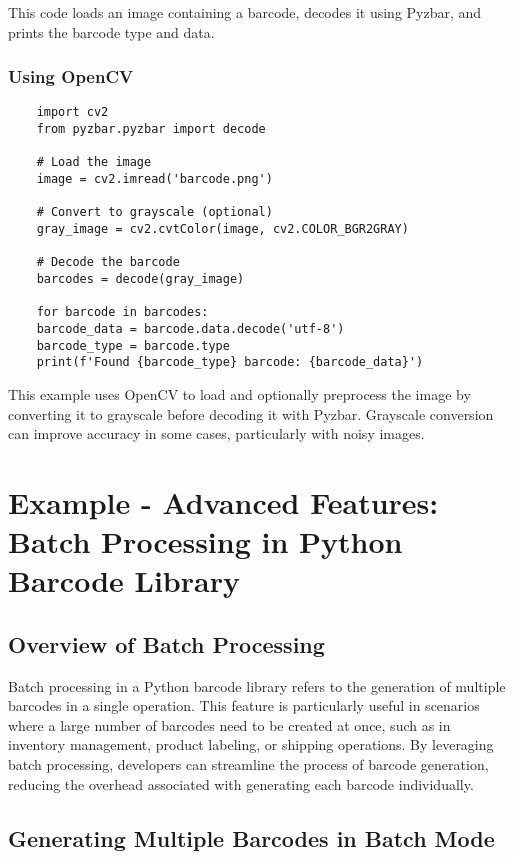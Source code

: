 This code loads an image containing a barcode, decodes it using Pyzbar, and prints the barcode type and data.

\subsubsection{Using OpenCV}

\begin{lstlisting}
	import cv2
	from pyzbar.pyzbar import decode
	
	# Load the image
	image = cv2.imread('barcode.png')
	
	# Convert to grayscale (optional)
	gray_image = cv2.cvtColor(image, cv2.COLOR_BGR2GRAY)
	
	# Decode the barcode
	barcodes = decode(gray_image)
	
	for barcode in barcodes:
	barcode_data = barcode.data.decode('utf-8')
	barcode_type = barcode.type
	print(f'Found {barcode_type} barcode: {barcode_data}')
\end{lstlisting}

This example uses OpenCV to load and optionally preprocess the image by converting it to grayscale before decoding it with Pyzbar. Grayscale conversion can improve accuracy in some cases, particularly with noisy images.


\section{Example - Advanced Features: Batch Processing in Python Barcode Library}

\subsection{Overview of Batch Processing}

Batch processing in a Python barcode library refers to the generation of multiple barcodes in a single operation. This feature is particularly useful in scenarios where a large number of barcodes need to be created at once, such as in inventory management, product labeling, or shipping operations. By leveraging batch processing, developers can streamline the process of barcode generation, reducing the overhead associated with generating each barcode individually.

\subsection{Generating Multiple Barcodes in Batch Mode}

